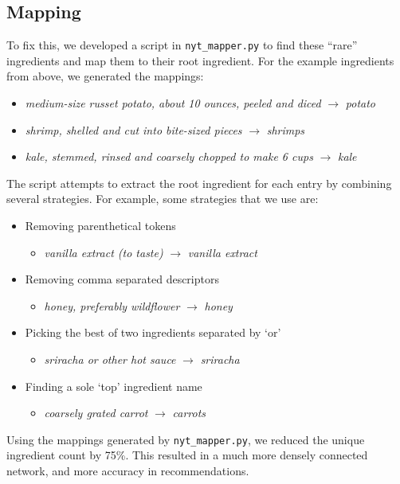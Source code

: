 \documentclass{acm_proc_article-sp}
\begin{document}
\subsection{Mapping}
To fix this, we developed a script in \texttt{nyt\_mapper.py} to find these ``rare'' ingredients and map them to their root ingredient. For the example ingredients from above, we generated the mappings:
\begin{itemize}
       \item {\em medium-size russet potato, about 10 ounces, peeled and diced} $\to$ {\em potato}
       \item {\em shrimp, shelled and cut into bite-sized pieces} $\to$ {\em shrimps}
       \item {\em kale, stemmed, rinsed and coarsely chopped to make 6 cups} $\to$ {\em kale}
\end{itemize}
The script attempts to extract the root ingredient for each entry by combining several strategies. For example, some strategies that we use are:
\begin{itemize}
       \item Removing parenthetical tokens 
       \begin{itemize}
              \item {\em vanilla extract (to taste)} $\to$ {\em vanilla extract}
       \end{itemize}
       \item Removing comma separated descriptors 
       \begin{itemize}
              \item {\em honey, preferably wildflower} $\to$ {\em honey}
       \end{itemize}
       \item Picking the best of two ingredients separated by `or' 
       \begin{itemize}
              \item {\em sriracha or other hot sauce} $\to$ {\em sriracha}
       \end{itemize}
       \item Finding a sole `top' ingredient name 
       \begin{itemize}
              \item {\em coarsely grated carrot} $\to$ {\em carrots}
       \end{itemize}
\end{itemize}
Using the mappings generated by \texttt{nyt\_mapper.py}, we reduced the unique ingredient count by 75\%. This resulted in a much more densely connected network, and more accuracy in recommendations.
\end{document}
